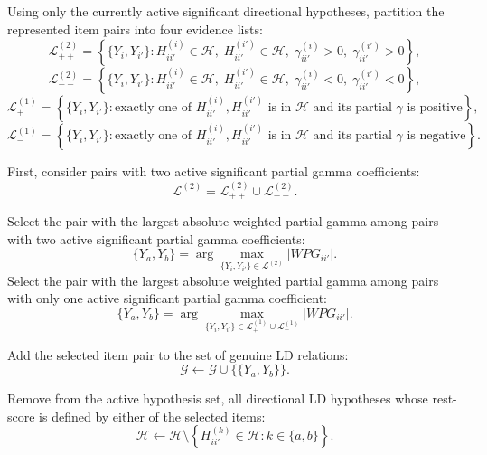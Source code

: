 \begin{breakablealgorithm}
\begin{algorithmic}[1]
    \State Using only the currently active significant directional hypotheses, partition
    the represented item pairs into four evidence lists:
    \[
    \mathcal{L}_{++}^{(2)}
    =
    \left\{
    \{Y_i,Y_{i'}\}
    :
    H_{ii'}^{(i)} \in \mathcal{H},\;
    H_{ii'}^{(i')} \in \mathcal{H},\;
    \gamma_{ii'}^{(i)} > 0,\;
    \gamma_{ii'}^{(i')} > 0
    \right\},
    \]
    \[
    \mathcal{L}_{--}^{(2)}
    =
    \left\{
    \{Y_i,Y_{i'}\}
    :
    H_{ii'}^{(i)} \in \mathcal{H},\;
    H_{ii'}^{(i')} \in \mathcal{H},\;
    \gamma_{ii'}^{(i)} < 0,\;
    \gamma_{ii'}^{(i')} < 0
    \right\},
    \]
    \[
    \mathcal{L}_{+}^{(1)}
    =
    \left\{
    \{Y_i,Y_{i'}\}
    :
    \text{exactly one of }
    H_{ii'}^{(i)},H_{ii'}^{(i')}
    \text{ is in } \mathcal{H}
    \text{ and its partial } \gamma \text{ is positive}
    \right\},
    \]
    \[
    \mathcal{L}_{-}^{(1)}
    =
    \left\{
    \{Y_i,Y_{i'}\}
    :
    \text{exactly one of }
    H_{ii'}^{(i)},H_{ii'}^{(i')}
    \text{ is in } \mathcal{H}
    \text{ and its partial } \gamma \text{ is negative}
    \right\}.
    \]

    \State First, consider pairs with two active significant partial gamma coefficients:
    \[
    \mathcal{L}^{(2)}
    =
    \mathcal{L}_{++}^{(2)}
    \cup
    \mathcal{L}_{--}^{(2)}.
    \]

        \State Select the pair with the largest absolute weighted partial gamma among
        pairs with two active significant partial gamma coefficients:
        \[
        \{Y_a,Y_b\}
        =
        \arg\max_{\{Y_i,Y_{i'}\}\in \mathcal{L}^{(2)}}
        \left|WPG_{ii'}\right|.
        \]
    \Else
        \State Select the pair with the largest absolute weighted partial gamma among
        pairs with only one active significant partial gamma coefficient:
        \[
        \{Y_a,Y_b\}
        =
        \arg\max_{\{Y_i,Y_{i'}\}\in
        \mathcal{L}_{+}^{(1)}\cup\mathcal{L}_{-}^{(1)}}
        \left|WPG_{ii'}\right|.
        \]
    \EndIf

    \State Add the selected item pair to the set of genuine LD relations:
    \[
    \mathcal{G}
    \gets
    \mathcal{G} \cup \{\{Y_a,Y_b\}\}.
    \]

    \State Remove from the active hypothesis set, all directional LD hypotheses whose
    rest-score is defined by either of the selected items:
    \[
    \mathcal{H}
    \gets
    \mathcal{H}
    \setminus
    \left\{
    H_{ii'}^{(k)} \in \mathcal{H}
    :
    k \in \{a,b\}
    \right\}.
    \]


\end{algorithmic}
\end{breakablealgorithm}
